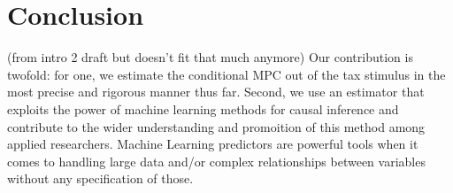 \section{Conclusion} \label{sec:conc}
(from intro 2 draft but doesn't fit that much anymore)
Our contribution is twofold: for one, we estimate the conditional MPC out of the tax stimulus in the most precise and rigorous manner thus far. Second, we use an estimator that exploits the power of machine learning methods for causal inference and contribute to the wider understanding and promoition of this method among applied researchers. Machine Learning predictors are powerful tools when it comes to handling large data and/or complex relationships between variables without any specification of those.